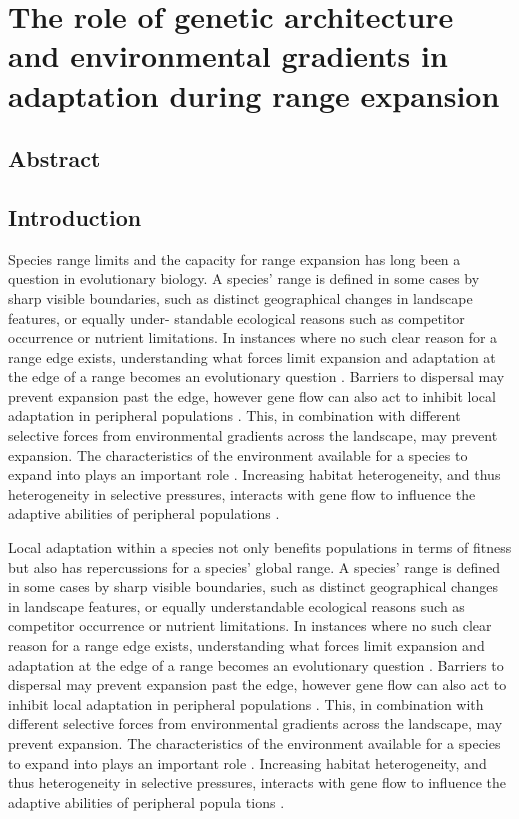 \chapter{The role of genetic architecture and environmental gradients in adaptation 
during range expansion}
\label{chap:heterogeneouslandscapes}

\section{Abstract}


\section{Introduction}

Species range limits and the capacity for range expansion has long been a question in evolutionary biology. 
A species’ range is defined in some cases by sharp visible boundaries, such as distinct geographical 
changes in landscape features, or equally under- standable ecological reasons such as competitor 
occurrence or nutrient limitations. In instances where no such clear reason for a range edge exists, 
understanding what forces limit expansion and adaptation at the edge of a range becomes an evolutionary 
question \citep{Bridle:2007, Kawecki:2008, Excoffier:2009}. Barriers to dispersal may 
prevent expansion past the edge, however gene flow can also act to inhibit local adaptation in 
peripheral populations \citep{Slatkin:1987, Kirkpatrick:1997}. This, in combination with 
different selective forces from environmental gradients across the landscape, may prevent expansion. 
The characteristics of the environment available for a species to expand into plays an important 
role \citep{Aguilee:2012, Barton:2001, Pease:1989}. Increasing habitat heterogeneity, and 
thus heterogeneity in selective pressures, interacts with gene flow to influence the adaptive 
abilities of peripheral populations \citep{Ronce:2001}.

Local adaptation within a species not only benefits populations in terms of fitness but also has 
repercussions for a species' global range. A species' range is defined in some cases by sharp visible 
boundaries, such as distinct geographical changes in landscape features, or equally understandable 
ecological reasons such as competitor occurrence or nutrient limitations. In instances where no 
such clear reason for a range edge exists, understanding what forces limit expansion and adaptation at 
the edge of a range becomes an evolutionary question \citep{Bridle:2007,Kawecki:2008,Excoffier:2009}. 
Barriers to dispersal may prevent expansion past the edge, however gene flow can also act to inhibit local 
adaptation in peripheral populations \citep{Slatkin:1987,Kirkpatrick:1997}. This, in combination with 
different selective forces from environmental gradients across the landscape, may prevent expansion. The 
characteristics of the environment available for a species to expand into plays an important role 
\citep{Aguilee:2012,Barton:2001,Pease:1989}. Increasing habitat heterogeneity, and thus heterogeneity 
in selective pressures, interacts with gene flow to influence the adaptive abilities of peripheral popula
tions \citep{Ronce:2001}.

